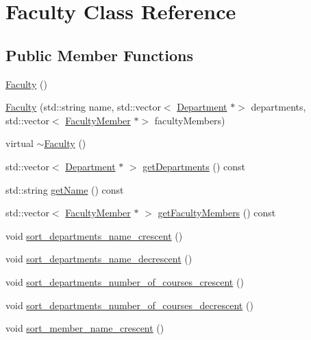 \hypertarget{classFaculty}{}\section{Faculty Class Reference}
\label{classFaculty}
\subsection*{Public Member Functions}
\begin{DoxyCompactItemize}
\item 
\hyperlink{classFaculty_a1c3f6a0eefcd4aee451e8c1db8e658fc}{Faculty} ()
\item 
\hyperlink{classFaculty_ad195c1e251d40e5e324df707e48eca00}{Faculty} (std\+::string name, std\+::vector$<$ \hyperlink{classDepartment}{Department} $\ast$$>$ departments, std\+::vector$<$ \hyperlink{classFacultyMember}{Faculty\+Member} $\ast$$>$ faculty\+Members)
\item 
virtual \hyperlink{classFaculty_ace9ed6a960bd1e1a07a4344ed63bdaf3}{$\sim$\+Faculty} ()
\item 
std\+::vector$<$ \hyperlink{classDepartment}{Department} $\ast$ $>$ \hyperlink{classFaculty_acdf3fba82bf16b6e41fff7d1179d00d5}{get\+Departments} () const
\item 
std\+::string \hyperlink{classFaculty_ad255367a0946117c9161a7214bc0e99d}{get\+Name} () const
\item 
std\+::vector$<$ \hyperlink{classFacultyMember}{Faculty\+Member} $\ast$ $>$ \hyperlink{classFaculty_a92e85922b9fdcef7bce1e9d5018a09e7}{get\+Faculty\+Members} () const
\item 
void \hyperlink{classFaculty_a7c88b74961f730faea3d5c4656580a40}{sort\+\_\+departments\+\_\+name\+\_\+crescent} ()
\item 
void \hyperlink{classFaculty_a8358e69ea6c932ace707bdfc72c399f0}{sort\+\_\+departments\+\_\+name\+\_\+decrescent} ()
\item 
void \hyperlink{classFaculty_a4408cd19b29026bd97bac96a6a026e5b}{sort\+\_\+departments\+\_\+number\+\_\+of\+\_\+courses\+\_\+crescent} ()
\item 
void \hyperlink{classFaculty_a168b261a3fe60485719afb5b1caa1575}{sort\+\_\+departments\+\_\+number\+\_\+of\+\_\+courses\+\_\+decrescent} ()
\item 
void \hyperlink{classFaculty_a1539207b8591b41e32f0108560a7843a}{sort\+\_\+member\+\_\+name\+\_\+crescent} ()
\item 
\mbox{\label{classFaculty_aebba7a64ff3c3e0d377b9bd296f07660}} 

\end{DoxyCompactItemize}
